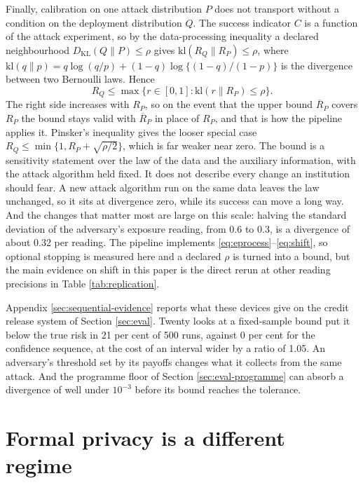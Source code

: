 \documentclass[11pt,a4paper]{article}
\theoremstyle{plain}
\theoremstyle{definition}
\theoremstyle{definition}
\theoremstyle{plain}
\begin{document}
Finally, calibration on one attack distribution $P$ does not transport without
a condition on the deployment distribution $Q$. The success indicator $C$ is a
function of the attack experiment, so by the data-processing inequality a
declared neighbourhood $D_{\mathrm{KL}}(Q\|P)\le\rho$ gives
$\mathrm{kl}(R_Q\|R_P)\le\rho$, where
$\mathrm{kl}(q\|p)=q\log(q/p)+(1-q)\log\{(1-q)/(1-p)\}$ is the divergence
between two Bernoulli laws. Hence
\begin{equation}
R_Q\le\max\{r\in[0,1]:\mathrm{kl}(r\|R_P)\le\rho\}.
\label{eq:shift}
\end{equation}
The right side increases with $R_P$, so on the event that the upper bound
$\overline R_P$ covers $R_P$ the bound stays valid with $\overline R_P$ in place
of $R_P$, and that is how the pipeline applies it. Pinsker's inequality gives
the looser special case $R_Q\le\min\{1,R_P+\sqrt{\rho/2}\}$, which is far
weaker near zero. The bound is a sensitivity statement over the law of the
data and the auxiliary information, with the attack algorithm held fixed. It
does not describe every change an institution should fear. A new attack
algorithm run on the same data leaves the law unchanged, so it sits at
divergence zero, while its success can move a long way. And the changes that
matter most are large on this scale: halving the standard deviation of the
adversary's exposure reading, from 0.6 to 0.3, is a divergence of about 0.32
per reading. The pipeline implements \eqref{eq:eprocess}--\eqref{eq:shift}, so
optional stopping is measured here and a declared $\rho$ is turned into a bound,
but the main evidence on shift in this paper is the direct rerun at other
reading precisions in Table \ref{tab:replication}.

Appendix \ref{sec:sequential-evidence} reports what these devices give on the
credit release system of Section \ref{sec:eval}. Twenty looks at a fixed-sample
bound put it below the true risk in 21 per cent of 500 runs, against 0 per cent
for the confidence sequence, at the cost of an interval wider by a ratio of 1.05.
An adversary's threshold set by its payoffs changes what it collects from the
same attack. And the programme floor of Section \ref{sec:eval-programme} can
absorb a divergence of well under $10^{-3}$ before its bound reaches the
tolerance.


\section{Formal privacy is a different regime}\label{sec:dp}
\end{document}
